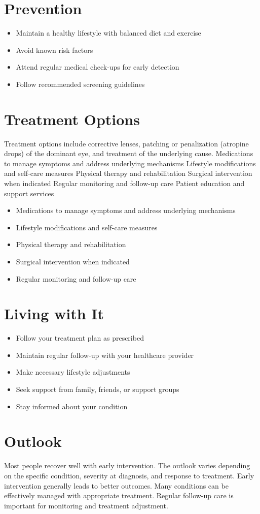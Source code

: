 \section{Prevention}
\begin{itemize}[noitemsep]
  \item Maintain a healthy lifestyle with balanced diet and exercise
  \item Avoid known risk factors
  \item Attend regular medical check-ups for early detection
  \item Follow recommended screening guidelines
\end{itemize}
\section{Treatment Options}
Treatment options include corrective lenses, patching or penalization (atropine drops) of the dominant eye, and treatment of the underlying cause. Medications to manage symptoms and address underlying mechanisms Lifestyle modifications and self-care measures Physical therapy and rehabilitation Surgical intervention when indicated Regular monitoring and follow-up care Patient education and support services

\begin{itemize}[noitemsep]
  \item Medications to manage symptoms and address underlying mechanisms
  \item Lifestyle modifications and self-care measures
  \item Physical therapy and rehabilitation
  \item Surgical intervention when indicated
  \item Regular monitoring and follow-up care
\end{itemize}
\section{Living with It}
\begin{itemize}[noitemsep]
  \item Follow your treatment plan as prescribed
  \item Maintain regular follow-up with your healthcare provider
  \item Make necessary lifestyle adjustments
  \item Seek support from family, friends, or support groups
  \item Stay informed about your condition
\end{itemize}
\section{Outlook}
Most people recover well with early intervention. The outlook varies depending on the specific condition, severity at diagnosis, and response to treatment. Early intervention generally leads to better outcomes. Many conditions can be effectively managed with appropriate treatment. Regular follow-up care is important for monitoring and treatment adjustment.

